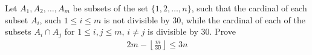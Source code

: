 Let $A_1, A_2, \ldots , A_m$ be subsets of the set $\{ 1,2, \ldots , n \}$, such that the cardinal of each subset $A_i$, such $1 \le i \le m$ is not divisible by $30$, while the cardinal of each of the subsets $A_i \cap A_j$ for $1 \le i,j \le m$, $i \neq j$ is divisible by $30$. Prove
\begin{align*} 2m - \left \lfloor \frac{m}{30} \right \rfloor  \le 3n \end{align*}